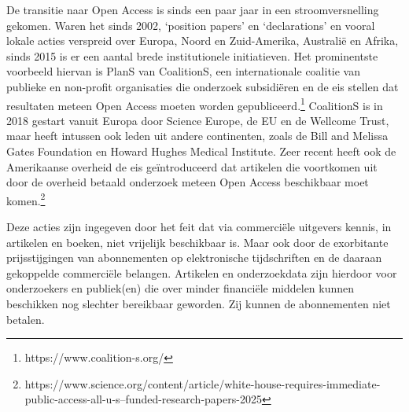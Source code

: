 \documentclass[empirical, authordate, ]{new-jote-article}
\begin{document}
	De transitie naar Open Access is sinds een paar jaar in een stroomversnelling gekomen. Waren het sinds 2002, ‘position papers' en ‘declarations' en vooral lokale acties verspreid over Europa, Noord en Zuid-Amerika, Australië en Afrika, sinds 2015 is er een aantal brede institutionele initiatieven. Het prominentste voorbeeld hiervan is PlanS van CoalitionS, een internationale coalitie van publieke en non-profit organisaties die onderzoek subsidiëren en de eis stellen dat resultaten meteen Open Access moeten worden gepubliceerd.\footnote{https://www.coalition-s.org/} CoalitionS is in 2018 gestart vanuit Europa door Science Europe, de EU en de Wellcome Trust, maar heeft intussen ook leden uit andere continenten, zoals de Bill and Melissa Gates Foundation en Howard Hughes Medical Institute. Zeer recent heeft ook de Amerikaanse overheid de eis geïntroduceerd dat artikelen die voortkomen uit door de overheid betaald onderzoek meteen Open Access beschikbaar moet komen.\footnote{https://www.science.org/content/article/white-house-requires-immediate-public-access-all-u-s--funded-research-papers-2025}



	Deze acties zijn ingegeven door het feit dat via commerciële uitgevers kennis, in artikelen en boeken, niet vrijelijk beschikbaar is. Maar ook door de exorbitante prijsstijgingen van abonnementen op elektronische tijdschriften en de daaraan gekoppelde commerciële belangen. Artikelen en onderzoekdata zijn hierdoor voor onderzoekers en publiek(en) die over minder financiële middelen kunnen beschikken nog slechter bereikbaar geworden. Zij kunnen de abonnementen niet betalen.
\end{document}
